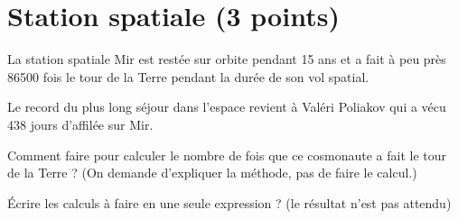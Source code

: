 \section{Station spatiale (3 points)}

La station spatiale Mir est restée sur orbite pendant 15 ans et a fait à peu près \num{86500} fois le tour de la Terre pendant la durée de son vol spatial.

Le record du plus long séjour dans l'espace revient à Valéri Poliakov qui a vécu 438 jours d'affilée sur Mir.

\begin{questions}
	\question[1\half] Comment faire pour calculer le nombre de fois que ce cosmonaute a fait le tour de la Terre ? (On demande d'expliquer la méthode, pas de faire le calcul.)
	
	
	\question[1\half] \'Ecrire les calculs à faire en une seule expression ? (le résultat n'est pas attendu)
\end{questions}